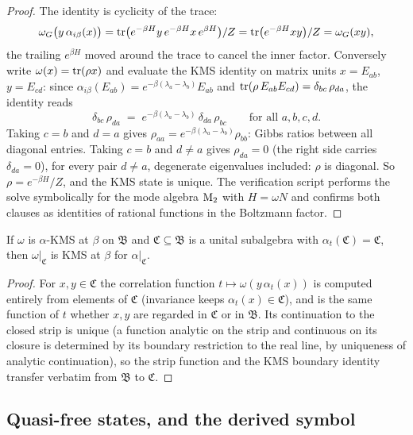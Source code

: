 \begin{proof}
The identity is cyclicity of the trace:
\[
\omega_G\bigl(y\,\alpha_{i\beta}(x)\bigr) = \operatorname{tr}\bigl(e^{-\beta H}y\,e^{-\beta H}x\,e^{\beta H}\bigr)/Z = \operatorname{tr}\bigl(e^{-\beta H}xy\bigr)/Z = \omega_G(xy),
\]
the trailing $e^{\beta H}$ moved around the trace to cancel the inner factor. Conversely write $\omega(x) = \operatorname{tr}(\rho x)$ and evaluate the KMS identity on matrix units $x = E_{ab}$, $y = E_{cd}$: since $\alpha_{i\beta}(E_{ab}) = e^{-\beta(\lambda_a - \lambda_b)}E_{ab}$ and $\operatorname{tr}(\rho\,E_{ab}E_{cd}) = \delta_{bc}\,\rho_{da}$, the identity reads
\[
\delta_{bc}\,\rho_{da} \;=\; e^{-\beta(\lambda_a - \lambda_b)}\,\delta_{da}\,\rho_{bc}
\qquad \text{for all } a, b, c, d.
\]
Taking $c = b$ and $d = a$ gives $\rho_{aa} = e^{-\beta(\lambda_a - \lambda_b)}\rho_{bb}$: Gibbs ratios between all diagonal entries. Taking $c = b$ and $d \neq a$ gives $\rho_{da} = 0$ (the right side carries $\delta_{da} = 0$), for every pair $d \neq a$, degenerate eigenvalues included: $\rho$ is diagonal. So $\rho = e^{-\beta H}/Z$, and the KMS state is unique. The verification script performs the solve symbolically for the mode algebra $\mathrm{M}_2$ with $H = \omega N$ and confirms both clauses as identities of rational functions in the Boltzmann factor.
\end{proof}

\begin{lemma}\label{lem:restrict}
If $\omega$ is $\alpha$-KMS at $\beta$ on $\mathfrak{B}$ and $\mathfrak{C} \subseteq \mathfrak{B}$ is a unital subalgebra with $\alpha_t(\mathfrak{C}) = \mathfrak{C}$, then $\omega|_{\mathfrak{C}}$ is KMS at $\beta$ for $\alpha|_{\mathfrak{C}}$.
\end{lemma}

\begin{proof}
For $x, y \in \mathfrak{C}$ the correlation function $t \mapsto \omega(y\,\alpha_t(x))$ is computed entirely from elements of $\mathfrak{C}$ (invariance keeps $\alpha_t(x) \in \mathfrak{C}$), and is the same function of $t$ whether $x, y$ are regarded in $\mathfrak{C}$ or in $\mathfrak{B}$. Its continuation to the closed strip is unique (a function analytic on the strip and continuous on its closure is determined by its boundary restriction to the real line, by uniqueness of analytic continuation), so the strip function and the KMS boundary identity transfer verbatim from $\mathfrak{B}$ to $\mathfrak{C}$.
\end{proof}

\subsection{Quasi-free states, and the derived symbol}\label{subsec:quasifree}

